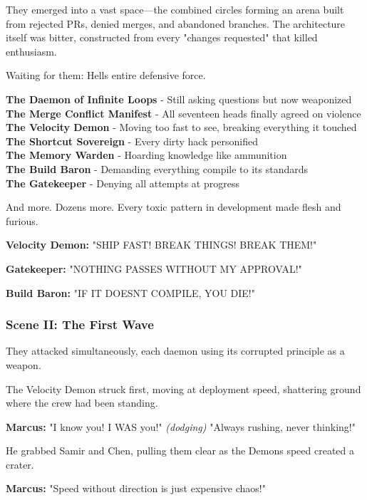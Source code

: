 They emerged into a vast space---the combined circles forming an arena built from rejected PRs, denied merges, and abandoned branches. The architecture itself was bitter, constructed from every "changes requested" that killed enthusiasm.

Waiting for them: Hell\textquotesingle s entire defensive force.

\textbf{The Daemon of Infinite Loops} - Still asking questions but now weaponized\\
\textbf{The Merge Conflict Manifest} - All seventeen heads finally agreed on violence\\
\textbf{The Velocity Demon} - Moving too fast to see, breaking everything it touched\\
\textbf{The Shortcut Sovereign} - Every dirty hack personified\\
\textbf{The Memory Warden} - Hoarding knowledge like ammunition\\
\textbf{The Build Baron} - Demanding everything compile to its standards\\
\textbf{The Gatekeeper} - Denying all attempts at progress

And more. Dozens more. Every toxic pattern in development made flesh and furious.

\textbf{Velocity Demon:} "SHIP FAST! BREAK THINGS! BREAK THEM!"

\textbf{Gatekeeper:} "NOTHING PASSES WITHOUT MY APPROVAL!"

\textbf{Build Baron:} "IF IT DOESN\textquotesingle T COMPILE, YOU DIE!"

\bookdivider

\subsubsection{Scene II: The First Wave}\label{scene-ii-the-first-wave}

They attacked simultaneously, each daemon using its corrupted principle as a weapon.

The Velocity Demon struck first, moving at deployment speed, shattering ground where the crew had been standing.

\textbf{Marcus:} "I know you! I WAS you!" \emph{(dodging)} "Always rushing, never thinking!"

He grabbed Samir and Chen, pulling them clear as the Demon\textquotesingle s speed created a crater.

\textbf{Marcus:} "Speed without direction is just expensive chaos!"

